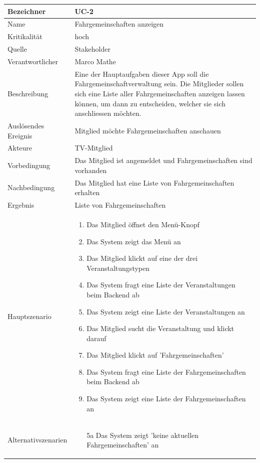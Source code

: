 \begin{table}[ht]
\centering
  \begin{tabular}{ l | p{10cm} }
	\hline
	\rowcolor{gray}
	Bezeichner		&	UC-2\\ \hline
	Name			&	Fahrgemeinschaften anzeigen\\ \hline
	Kritikalität		&	hoch\\ \hline
	Quelle			&	Stakeholder\\ \hline
	Verantwortlicher	&	Marco Mathe\\ \hline
	Beschreibung	&	Eine der Hauptaufgaben dieser App soll die Fahrgemeinschaftverwaltung sein. Die Mitglieder sollen sich eine Liste aller Fahrgemeinschaften anzeigen lassen können, um dann zu entscheiden, welcher sie sich anschliessen möchten.\\ \hline
	Auslösendes Ereignis&	Mitglied möchte Fahrgemeinschaften anschauen\\ \hline
	Akteure		&	TV-Mitglied\\ \hline
	Vorbedingung	&	Das Mitglied ist angemeldet und Fahrgemeinschaften sind vorhanden\\ \hline
	Nachbedingung	&	Das Mitglied hat eine Liste von Fahrgemeinschaften erhalten\\ \hline
	Ergebnis		&	Liste von Fahrgemeinschaften\\ \hline
	Hauptszenario	&	\begin{enumerate}
					\item Das Mitglied öffnet den Menü-Knopf
					\item Das System zeigt das Menü an
					\item Das Mitglied klickt auf eine der drei Veranstaltungstypen
					\item Das System fragt eine Liste der Veranstaltungen beim Backend ab
					\item Das System zeigt eine Liste der Veranstaltungen an
					\item Das Mitglied sucht die Veranstaltung und klickt darauf
					\item Das Mitglied klickt auf 'Fahrgemeinschaften'
					\item Das System fragt eine Liste der Fahrgemeinschaften beim Backend ab
					\item Das System zeigt eine Liste der Fahrgemeinschaften an
					\end{enumerate}
					\\ \hline
	Alternativszenarien	&	\begin{enumerate}
					\item[5a] Das System zeigt 'keine aktuellen Fahrgemeinschaften' an

\end{enumerate}
\end{tabular}
\end{table}
